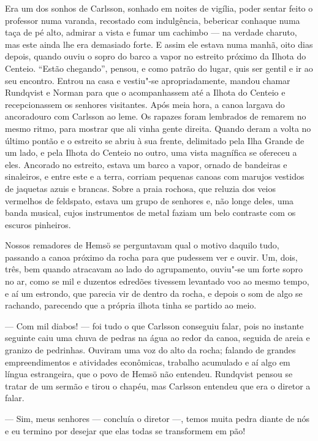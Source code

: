 Era um dos sonhos de Carlsson, sonhado em noites de vigília, poder sentar feito
o professor numa varanda, recostado com indulgência, bebericar conhaque numa
taça de pé alto, admirar a vista e fumar um cachimbo --- na verdade charuto, mas
este ainda lhe era demasiado forte. E assim ele estava numa manhã, oito dias
depois, quando ouviu o sopro do barco a vapor no estreito próximo da Ilhota do
Centeio. ``Estão chegando'', pensou, e como patrão do lugar, quis ser
gentil e ir ao seu encontro. Entrou na casa e vestiu"-se apropriadamente,
mandou chamar Rundqvist e Norman para que o acompanhassem até a Ilhota do
Centeio e recepcionassem os senhores visitantes. Após meia hora, a canoa
largava do ancoradouro com Carlsson ao leme. Os rapazes foram lembrados de
remarem no mesmo ritmo, para mostrar que ali vinha gente direita. Quando deram a
volta no último pontão e o estreito se abriu à sua frente, delimitado pela Ilha
Grande de um lado, e pela Ilhota do Centeio no outro, uma vista magnífica se
ofereceu a eles. Ancorado no estreito, estava um barco a vapor, ornado de
bandeiras e sinaleiros, e entre este e a terra, corriam pequenas canoas com
marujos vestidos de jaquetas azuis e brancas. Sobre a praia rochosa, que reluzia
dos veios vermelhos de feldspato, estava um grupo de senhores e, não longe deles,
uma banda musical, cujos instrumentos de metal faziam um belo contraste com os
escuros pinheiros.

Nossos remadores de Hemsö se perguntavam qual o motivo daquilo tudo, passando a
canoa próximo da rocha para que pudessem ver e ouvir. Um, dois, três, bem quando
atracavam ao lado do agrupamento, ouviu"-se um forte sopro no ar, como se mil e
duzentos edredões tivessem levantado voo ao mesmo tempo, e aí um estrondo, que
parecia vir de dentro da rocha, e depois o som de algo se rachando, parecendo
que a própria ilhota tinha se partido ao meio.

--- Com mil diabos! --- foi tudo o que Carlsson conseguiu falar, pois no instante
seguinte caiu uma chuva de pedras na água ao redor da canoa, seguida de areia e
granizo de pedrinhas. Ouviram uma voz do alto da rocha; falando de grandes
empreendimentos e atividades econômicas, trabalho acumulado e aí algo em língua
estrangeira, que o povo de Hemsö não entendeu. Rundqvist pensou se tratar de um
sermão e tirou o chapéu, mas Carlsson entendeu que era o diretor a falar.

--- Sim, meus senhores --- concluía o diretor ---, temos muita pedra diante de nós
e eu termino por desejar que elas todas se transformem em pão!

